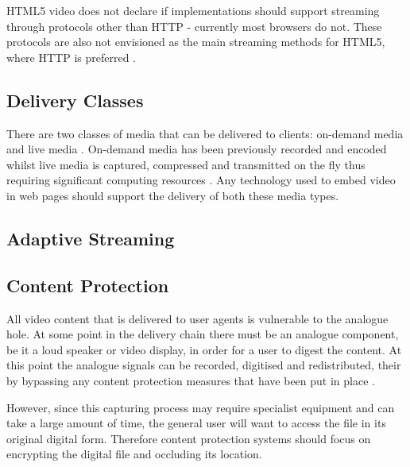 \documentclass[journal]{IEEEtran}
\begin{document}
HTML5 video does not declare if implementations should support streaming through protocols other than HTTP - currently most browsers do not. %
These protocols are also not envisioned as the main streaming methods for HTML5, where HTTP is preferred \cite{article:towardsVideoOnTheWebWithHTML5}.


\subsection{Delivery Classes}
There are two classes of media that can be delivered to clients: on-demand media and live media \cite{techreport:aReviewOfHTTPLiveStreaming}. On-demand media has been previously recorded and encoded whilst live media is captured, compressed and transmitted on the fly thus requiring significant computing resources \cite{techreport:aReviewOfHTTPLiveStreaming}. %
Any technology used to embed video in web pages should support the delivery of both these media types.

% 

\subsection{Adaptive Streaming}

% 

\subsection{Content Protection}
All video content that is delivered to user agents is vulnerable to the analogue hole. At some point in the delivery chain there must be an analogue component, be it a loud speaker or video display, in order for a user to digest the content. At this point the analogue signals can be recorded, digitised and redistributed, their by bypassing any content protection measures that have been put in place \cite{inproceedings:closingTheAnalogueHole}. %

However, since this capturing process may require specialist equipment and can take a large amount of time, %
the general user will want to access the file in its original digital form. Therefore content protection systems should focus on encrypting the digital file and occluding its location.
\end{document}
